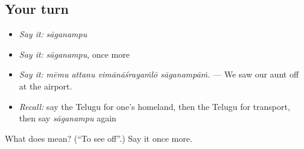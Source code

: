 \subsection*{Your turn}
\begin{itemize}
\raggedright
  \item \emph{Say it:} \emph{sāganampu}
  \item \emph{Say it:} \emph{sāganampu}, once more
  \item \emph{Say it:} \emph{mēmu attanu vimānāśrayaṁlō sāganampāṁ.} — We saw our aunt off at the airport.
  \item \emph{Recall:} say the Telugu for one's homeland, then the Telugu for transport, then say \emph{sāganampu} again
\end{itemize}

\begin{tcolorbox}[breakable,colback=teal!4,colframe=teal!35!black,title={Before you move on}]
What does  mean? (\textquotedblleft{}To see off\textquotedblright{}.) Say it once more.
\end{tcolorbox}

